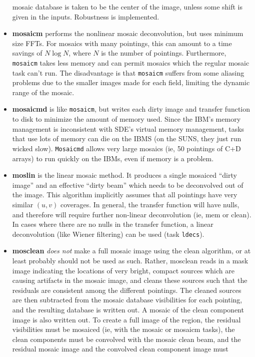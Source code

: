 \begin{itemize}
	mosaic database is taken to be the center of the image, unless some
	shift is given in the inputs.  Robustness is implemented.
\item {\bf mosaicm} performs the nonlinear mosaic deconvolution, but uses
	minimum size FFTs.  For mosaics with many pointings, this can
	amount to a time savings of $N \log N$, where $N$ is the number of
	pointings.  Furthermore, {\tt mosaicm} takes less memory and can permit mosaics
	which the regular mosaic task can't run.  The disadvantage is that
	{\tt mosaicm} suffers from some aliasing problems due to the smaller images
	made for each field, limiting the dynamic range of the mosaic.
\item {\bf mosaicmd} is like {\tt mosaicm}, but writes each dirty image and
	transfer function to disk to minimize the amount of memory
	used.  Since the IBM's memory management is inconsistent with
	SDE's virtual memory management, tasks that use lots of memory
	can die on the IBMS (on the SUNS, they just run wicked slow).
	{\tt Mosaicmd} allows very large mosaics (ie, 50 pointings of C+D
	arrays) to run quickly on the IBMs, even if memory is a
	problem.
\item {\bf moslin} is the linear mosaic method.  It produces a single
	mosaiced ``dirty image'' and an effective ``dirty beam'' which
	needs to be deconvolved out of the image.  This algorithm
	implicitly assumes that all pointings have very similar
	$(u,v)$ coverages.  In general, the transfer function will
	have nulls, and therefore will require further non-linear
	deconvolution (ie, mem or clean).  In cases where there are no
	nulls in the transfer function, a linear deconvolution (like
	Wiener filtering) can be used (task {\tt ldecs}).
\item {\bf mosclean} {\it does not} make a full mosaic image using the
	clean algorithm, or at least probably should not be used as such.
	Rather, mosclean reads in a mask image indicating the locations
	of very bright, compact sources which are causing artifacts in
	the mosaic image, and cleans these sources such that the residuals
	are consistent among the different pointings.  The cleaned sources
	are then subtracted from the mosaic database visibilities for each pointing,
	and the resulting database is written out.  A mosaic of the clean component
	image is also written out.  To create a full image of the region,
	the residual visibilities must be mosaiced (ie, with the mosaic or mosaicm
	tasks), the clean components must be convolved with the mosaic clean beam,
	and the residual mosaic image and the convolved clean component image must

\end{itemize}
